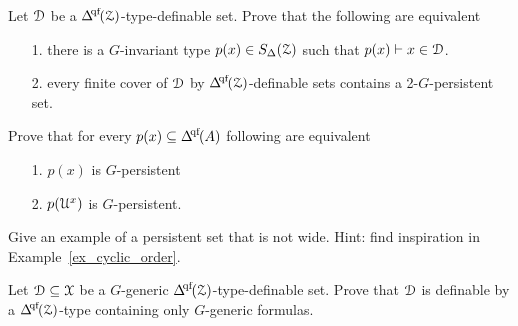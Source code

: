\begin{exercise}
  Let $\EuScript D$ be a $\qfDelta(\Z)$-type-definable set.
  Prove that the following are equivalent 
  \begin{itemize}
    \item[1.] there is a $G$-invariant type $p(x)\in S_\Delta(\EuScript Z)$ such that $p(x)\vdash x\in\EuScript D$.
    \item[2.] every finite cover of $\EuScript D$ by $\qfDelta(\Z)$-definable sets contains a 2-$G$-persistent set.
  \end{itemize}
\end{exercise}


\begin{exercise}\label{ex_persistent_types}
  Prove that for every $p(x)\subseteq \qfDelta(A)$ following are equivalent
  \begin{itemize}
    \item[1.] $p(x)$ is $G$-persistent
    \item[2.] $p(\EuScript U^x)$ is $G$-persistent.
  \end{itemize}
\end{exercise}

\begin{exercise}
  Give an example of a persistent set that is not wide.
  Hint: find inspiration in Example~\ref{ex_cyclic_order}.
\end{exercise}

\begin{exercise}\label{ex_generic_type_vs_formulas}
  Let $\EuScript D\subseteq\EuScript X$ be a $G$-generic $\qfDelta(\Z)$-type-definable set.
  Prove that $\EuScript D$ is definable by a $\qfDelta(\Z)$-type containing only $G$-generic formulas.
\end{exercise}



